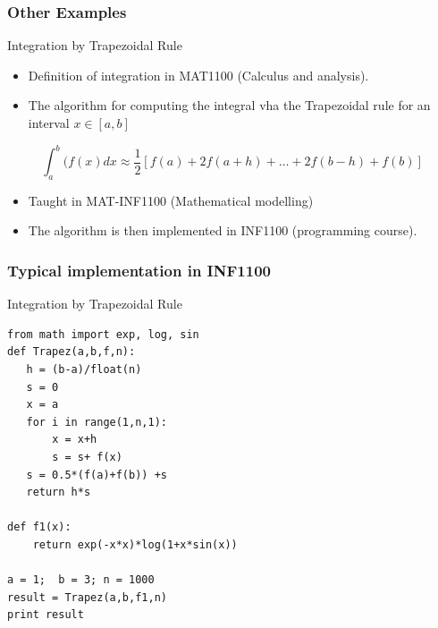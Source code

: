\documentclass{beamer}
\begin{document}
\begin{frame}
\frametitle{Other Examples}

\begin{block}{Integration by Trapezoidal Rule  }

\begin{itemize}
\item Definition of integration  in MAT1100 (Calculus and analysis).

\item The algorithm for computing the  integral vha the Trapezoidal rule for an interval $x \in [a,b]$
\end{itemize}

\noindent
\[
  \int_a^b(f(x) dx \approx \frac{1}{2}\left [f(a)+2f(a+h)+\dots+2f(b-h)+f(b)\right] 
\]
\begin{itemize}
\item Taught   in MAT-INF1100  (Mathematical modelling)

\item The algorithm is then implemented in  INF1100 (programming course).
\end{itemize}

\noindent
\end{block}
\end{frame}

\begin{frame}
\frametitle{Typical implementation in INF1100}

\begin{block}{Integration by Trapezoidal Rule  }

\begin{verbatim}
from math import exp, log, sin
def Trapez(a,b,f,n):
   h = (b-a)/float(n)
   s = 0
   x = a
   for i in range(1,n,1):
       x = x+h
       s = s+ f(x)
   s = 0.5*(f(a)+f(b)) +s
   return h*s

def f1(x):
    return exp(-x*x)*log(1+x*sin(x))

a = 1;  b = 3; n = 1000
result = Trapez(a,b,f1,n)
print result
\end{verbatim}
\end{block}
\end{frame}
\end{document}
